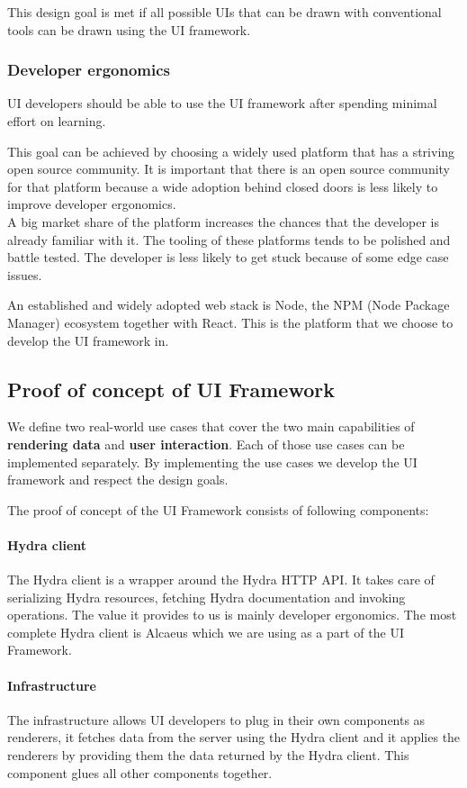 This design goal is met if all possible UIs that can be drawn with conventional tools can be drawn using the UI framework.

\subsubsection{Developer ergonomics}
UI developers should be able to use the UI framework after spending minimal effort on learning.

This goal can be achieved by choosing a widely used platform that has a striving open source community. It is important that there is an open source community for that platform because a wide adoption behind closed doors is less likely to improve developer ergonomics. \\
A big market share of the platform increases the chances that the developer is already familiar with it. The tooling of these platforms tends to be polished and battle tested. The developer is less likely to get stuck because of some edge case issues.

An established and widely adopted web stack is Node, the NPM (Node Package Manager) ecosystem together with React. This is the platform that we choose to develop the UI framework in.

\subsection{Proof of concept of UI Framework}\label{proofofconcept}
We define two real-world use cases that cover the two main capabilities of \textbf{rendering data} and \textbf{user interaction}. Each of those use cases can be implemented separately. By implementing the use cases we develop the UI framework and respect the design goals.

The proof of concept of the UI Framework consists of following components:

\paragraph{Hydra client}
The Hydra client is a wrapper around the Hydra HTTP API. It takes care of serializing Hydra resources, fetching Hydra documentation and invoking operations. The value it provides to us is mainly developer ergonomics. The most complete Hydra client is Alcaeus which we are using as a part of the UI Framework.

\paragraph{Infrastructure}
The infrastructure allows UI developers to plug in their own components as renderers, it fetches data from the server using the Hydra client and it applies the renderers by providing them the data returned by the Hydra client. This component glues all other components together.

